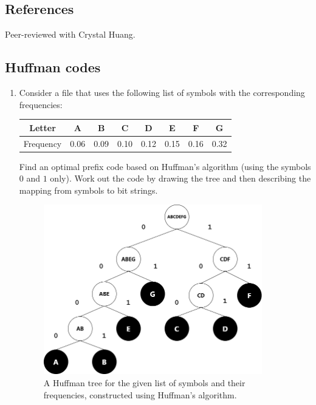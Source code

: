 \def\lc{\left\lceil}   
\def\rc{\right\rceil}
\runningheadrule
\firstpageheadrule
\cfoot{}
\subsection*{References}
Peer-reviewed with Crystal Huang.
\subsection{Huffman codes}
\begin{enumerate}
\item 
Consider a file that uses the following list of symbols with the corresponding frequencies:
\begin{center}
\begin{tabular}{|c|c|c|c|c|c|c|c|}
\hline
     Letter & A & B & C & D & E & F & G\\
     \hline 
     Frequency & 0.06 & 0.09 & 0.10 & 0.12 & 0.15 & 0.16 & 0.32\\
     \hline
\end{tabular}
\end{center}

\noindent Find an optimal prefix code based on Huffman's algorithm (using the symbols $0$ and $1$ only). Work out the code by drawing the tree and then describing the mapping from symbols to bit strings.
\begin{figure}[h]
\centering
\includegraphics[width=9.5cm]{../images/hw7-1-1.png}
\caption{A Huffman tree for the given list of symbols and their frequencies, constructed using Huffman's algorithm.}
\label{fig:hw7_1_1}
\end{figure}


\end{enumerate}
